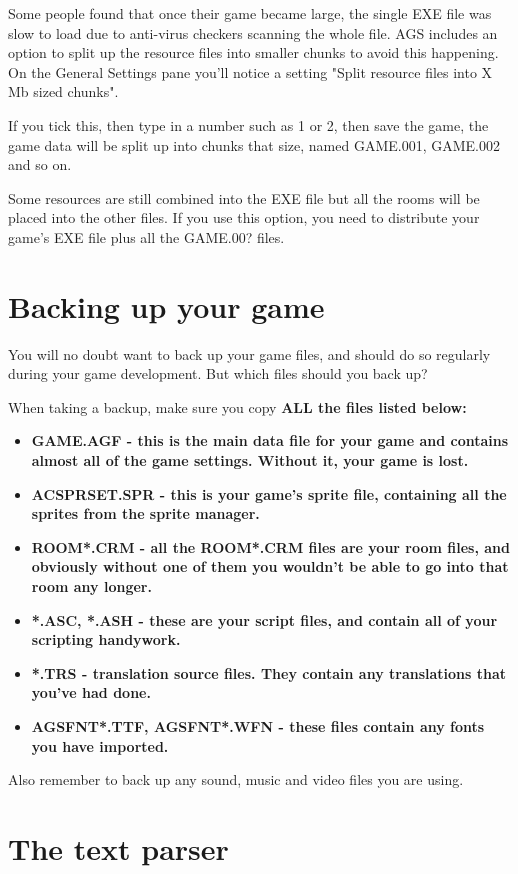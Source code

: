 Some people found that once their game became large, the single EXE file
was slow to load due to anti-virus checkers scanning the whole file.
AGS includes an option to split up the resource files into smaller chunks
to avoid this happening. On the General Settings pane you'll notice a
setting "Split resource files into X Mb sized chunks".

If you tick this, then type in a number such as 1 or 2, then save the game,
the game data will be split up into chunks that size, named GAME.001,
GAME.002 and so on.

Some resources are still combined into the EXE file but
all the rooms will be placed into the other files.
If you use this option, you need to distribute your game's EXE file plus
all the GAME.00? files.


\section{Backing up your game}%

You will no doubt want to back up your game files, and should do so regularly during
your game development. But which files should you back up?

When taking a backup, make sure you copy \bf{ALL} the files listed below:

\begin{itemize}
\item \bf{GAME.AGF} - this is the main data file for your game and contains almost
all of the game settings. Without it, your game is lost.
\item \bf{ACSPRSET.SPR} - this is your game's sprite file, containing all the sprites
from the sprite manager.
\item \bf{ROOM*.CRM} - all the ROOM*.CRM files are your room files, and obviously without
one of them you wouldn't be able to go into that room any longer.
\item \bf{*.ASC, *.ASH} - these are your script files, and contain all of your
scripting handywork.
\item \bf{*.TRS} - translation source files. They contain any translations that you've
had done.
\item \bf{AGSFNT*.TTF, AGSFNT*.WFN} - these files contain any fonts you have imported.
\end{itemize}

Also remember to back up any sound, music and video files you are using.

\section{The text parser}\label{TextParser}%

